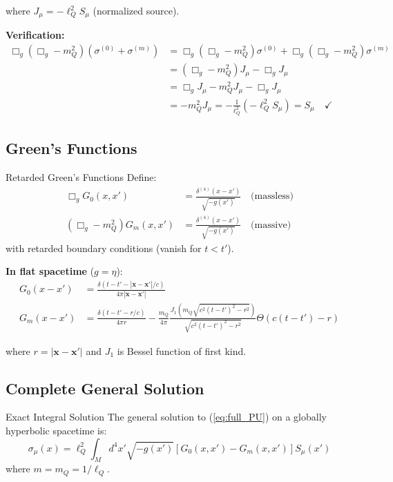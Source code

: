 \documentclass[11pt,a4paper]{article}
\theoremstyle{definition}
\theoremstyle{remark}
\begin{document}
		where $J_\mu = -\ell_Q^2 S_\mu$ (normalized source).
		
		\textbf{Verification:}
		\begin{align}
			\Box_g(\Box_g - m_Q^2)(\sigma^{(0)} + \sigma^{(m)}) &= \Box_g(\Box_g - m_Q^2)\sigma^{(0)} + \Box_g(\Box_g - m_Q^2)\sigma^{(m)}\\
			&= (\Box_g - m_Q^2)J_\mu - \Box_g J_\mu\\
			&= \Box_g J_\mu - m_Q^2 J_\mu - \Box_g J_\mu\\
			&= -m_Q^2 J_\mu = -\frac{1}{\ell_Q^2}(-\ell_Q^2 S_\mu) = S_\mu \quad \checkmark
		\end{align}
		
		\subsection{Green's Functions}
		
		Retarded Green's Functions
			Define:
			\begin{align}
				\Box_g G_0(x,x') &= \frac{\delta^{(4)}(x-x')}{\sqrt{-g(x')}} \quad \text{(massless)}\\
				(\Box_g - m_Q^2)G_m(x,x') &= \frac{\delta^{(4)}(x-x')}{\sqrt{-g(x')}} \quad \text{(massive)}
			\end{align}
			with retarded boundary conditions (vanish for $t < t'$).
		
		\textbf{In flat spacetime} ($g = \eta$):
		\begin{align}
			G_0(x-x') &= \frac{\delta(t - t' - |\mathbf{x}-\mathbf{x}'|/c)}{4\pi|\mathbf{x}-\mathbf{x}'|}\\
			G_m(x-x') &= \frac{\delta(t - t' - r/c)}{4\pi r} - \frac{m_Q}{4\pi}\frac{J_1(m_Q\sqrt{c^2(t-t')^2 - r^2})}{\sqrt{c^2(t-t')^2 - r^2}}\Theta(c(t-t') - r)
		\end{align}
		
		where $r = |\mathbf{x}-\mathbf{x}'|$ and $J_1$ is Bessel function of first kind.
		
		\subsection{Complete General Solution}
		
		Exact Integral Solution
			The general solution to (\ref{eq:full_PU}) on a globally hyperbolic spacetime is:
			\begin{equation}\label{eq:exact_solution}
				\boxed{\sigma_\mu(x) = \ell_Q^2\int_M d^4x'\sqrt{-g(x')}\left[G_0(x,x') - G_m(x,x')\right]S_\mu(x')}
			\end{equation}
			where $m = m_Q = 1/\ell_Q$.
		
\end{document}

